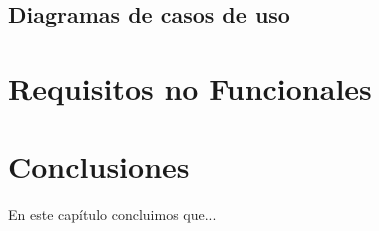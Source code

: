 

\subsection{Diagramas de casos de uso}









\section{Requisitos no Funcionales}





\section{Conclusiones}

En este capítulo concluimos que...
